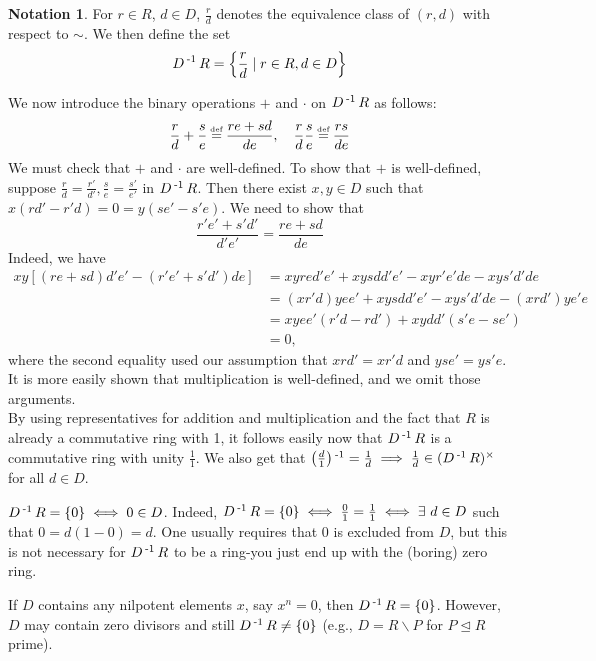 \documentclass[11pt]{book}
\newcounter{counter}
\theoremstyle{definition}   \newtheorem{defn}[counter]{Definition} %
\newtheorem*{notation*}{Notation}   \newtheorem{example}[counter]{Example(s)}   \newtheorem*{example*}{Example(s)}   \newtheorem*{warning}{Warning} \newtheorem*{corollary*}{Corollary}
\newcommand{\bs}{\backslash}   \newcommand{\A}{\mathcal{A}}   \newcommand{\sy}{\textnormal{Syl}}   \newcommand{\size}[1]{\left| #1 \right|}
\newcommand{\nsg}{\mathrel{\unlhd}}   \newcommand{\ind}{\parindent24pt}   \newcommand{\vn}{\varnothing}
\newcommand\myeq{\mathrel{\overset{\makebox[0pt]{\mbox{\normalfont\tiny\sffamily \textrm{def}}}}{=}}}
\newcommand{\vs}{\vspace{8pt}}
\numberwithin{counter}{chapter}
\begin{document}
\vs

\begin{notation*}
For $r \in R$, $d \in D$, $\frac{r}{d}$ denotes the equivalence class of $(r,d)$ with respect to $\sim$. We then define the set
	\[D\operatorname{^{-1}} R = \left\{ \frac{r}{d} \mid r \in R, d \in D \right\} \]
\end{notation*}

\vs

We now introduce the binary operations $+$ and $\cdot$ on $D\operatorname{^{-1}} R$ as follows:
	\[\frac{r}{d} + \frac{s}{e} \myeq \frac{re+sd}{de}, \quad \frac{r}{d}\frac{s}{e} \myeq \frac{rs}{de} \]
We must check that $+$ and $\cdot$ are well-defined. To show that $+$ is well-defined, suppose $\frac{r}{d} = \frac{r'}{d'}, \frac{s}{e} = \frac{s'}{e'}$ in $D\operatorname{^{-1}} R$. Then there exist $x,y \in D$ such that $x(rd'-r'd) = 0 = y(se'-s'e)$. We need to show that
	\[\frac{r'e'+s'd'}{d'e'} = \frac{re+sd}{de} \]
Indeed, we have
\begin{align*}
xy[(re+sd)d'e' - (r'e'+s'd')de] &= xyred'e' + xysdd'e' - xyr'e'de - xys'd'de \\
&= (xr'd)yee' + xysdd'e' - xys'd'de - (xrd')ye'e \\
&= xyee'(r'd-rd') + xydd'(s'e-se') \\
&= 0,
\end{align*}
where the second equality used our assumption that $xrd' = xr'd$ and $yse' = ys'e$. It is more easily shown that multiplication is well-defined, and we omit those arguments. \\

By using representatives for addition and multiplication and the fact that $R$ is already a commutative ring with 1, it follows easily now that $D\operatorname{^{-1}} R$ is a commutative ring with unity $\frac{1}{1}$. We also get that $\left( \frac{d}{1} \right)\operatorname{^{-1}} = \frac{1}{d} \implies \frac{1}{d} \in (D\operatorname{^{-1}} R)^{\times}$ for all $d \in D$.

\vs

\begin{remark*}
$D\operatorname{^{-1}} R = \{0\} \iff 0 \in D$. Indeed, $D\operatorname{^{-1}} R = \{0\} \iff \frac{0}{1} = \frac{1}{1} \iff \exists \ d \in D$ such that $0 = d(1-0) = d$. One usually requires that $0$ is excluded from $D$, but this is not necessary for $D\operatorname{^{-1}} R$ to be a ring-you just end up with the (boring) zero ring.

If $D$ contains any nilpotent elements $x$, say $x^n = 0$, then $D\operatorname{^{-1}} R = \{0\}$. However, $D$ may contain zero divisors and still $D\operatorname{^{-1}} R \ne \{0\}$ (e.g., $D = R \bs P$ for $P \nsg R$ prime).
\end{remark*}
\end{document}
